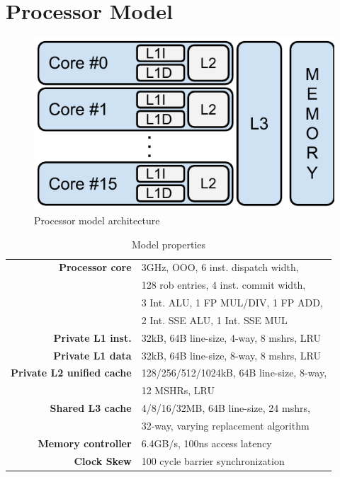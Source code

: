 \section{Processor Model}
\label{sec:methodology:processor_model}

\begin{figure}[ht]
\centering
\includegraphics[scale=.65]{figures/processor_model/processor_model}
\caption{Processor model architecture}
\label{fig:processor_model}
\end{figure}

\begin{table}[ht]
\centering
\begin{tabular}{rl}
\toprule
\bf{Processor core}                 & 3GHz, OOO, 6 inst. dispatch width,     \\
                                    & 128 rob entries, 4 inst. commit width, \\
                                    & 3 Int. ALU, 1 FP MUL/DIV, 1 FP ADD, \\
                                    & 2 Int. SSE ALU, 1 Int. SSE MUL \\
\bf{Private L1 inst.}               & 32kB, 64B line-size, 4-way, 8 mshrs, LRU \\
\bf{Private L1 data}                & 32kB, 64B line-size, 8-way, 8 mshrs, LRU \\
\bf{Private L2 unified cache}       & 128/256/512/1024kB, 64B line-size, 8-way, \\
                                    & 12 MSHRs, LRU      \\
\bf{Shared L3 cache}                & 4/8/16/32MB, 64B line-size, 24 mshrs, \\
                                    & 32-way, varying replacement algorithm         \\
\bf{Memory controller}              & 6.4GB/s, 100ns access latency         \\
\bf{Clock Skew}                     & 100 cycle barrier synchronization        \\
\bottomrule                             
\end{tabular}
\caption{Model properties}
\label{tbl:processor_model:properties}
\end{table}


